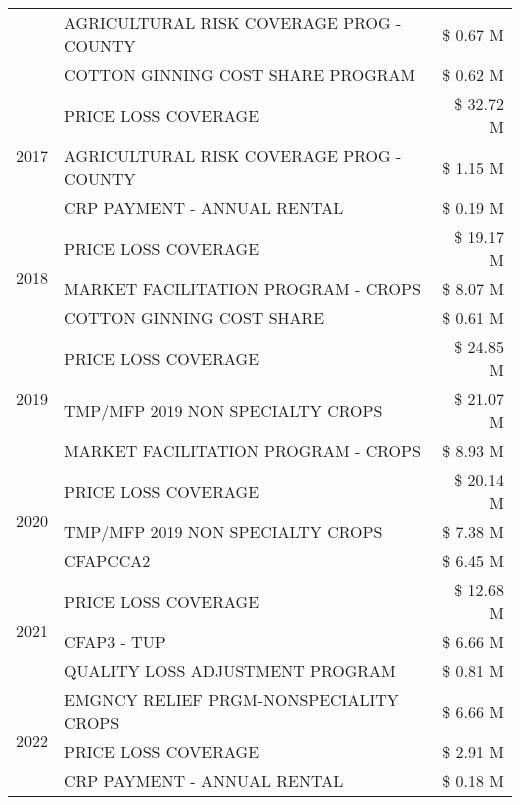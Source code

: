 \begin{tabular}{llr}
 & AGRICULTURAL RISK COVERAGE PROG - COUNTY & \$ 0.67 M \\
 & COTTON GINNING COST SHARE PROGRAM & \$ 0.62 M \\
\cline{1-3}
\multirow[t]{3}{*}{2017} & PRICE LOSS COVERAGE & \$ 32.72 M \\
 & AGRICULTURAL RISK COVERAGE PROG - COUNTY & \$ 1.15 M \\
 & CRP PAYMENT - ANNUAL RENTAL & \$ 0.19 M \\
\cline{1-3}
\multirow[t]{3}{*}{2018} & PRICE LOSS COVERAGE & \$ 19.17 M \\
 & MARKET FACILITATION PROGRAM - CROPS & \$ 8.07 M \\
 & COTTON GINNING COST SHARE & \$ 0.61 M \\
\cline{1-3}
\multirow[t]{3}{*}{2019} & PRICE LOSS COVERAGE & \$ 24.85 M \\
 & TMP/MFP 2019 NON SPECIALTY CROPS & \$ 21.07 M \\
 & MARKET FACILITATION PROGRAM - CROPS & \$ 8.93 M \\
\cline{1-3}
\multirow[t]{3}{*}{2020} & PRICE LOSS COVERAGE & \$ 20.14 M \\
 & TMP/MFP 2019 NON SPECIALTY CROPS & \$ 7.38 M \\
 & CFAPCCA2 & \$ 6.45 M \\
\cline{1-3}
\multirow[t]{3}{*}{2021} & PRICE LOSS COVERAGE & \$ 12.68 M \\
 & CFAP3 - TUP & \$ 6.66 M \\
 & QUALITY LOSS ADJUSTMENT PROGRAM & \$ 0.81 M \\
\cline{1-3}
\multirow[t]{3}{*}{2022} & EMGNCY RELIEF PRGM-NONSPECIALITY CROPS & \$ 6.66 M \\
 & PRICE LOSS COVERAGE & \$ 2.91 M \\
 & CRP PAYMENT - ANNUAL RENTAL & \$ 0.18 M \\
\cline{1-3}
\bottomrule
\end{tabular}
